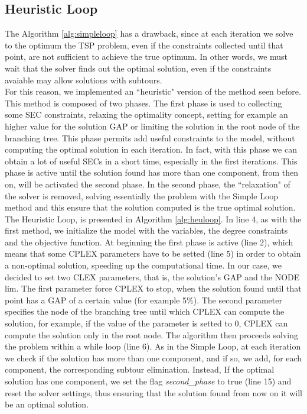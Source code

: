 \subsection{Heuristic Loop}
The Algorithm \ref{alg:simpleloop} has a drawback, since at each iteration we solve to the optimum the TSP problem, even if the constraints collected until that point, are not sufficient to achieve the true optimum. In other words, we must wait that the solver finds out the optimal solution, even if the constraints avaiable may allow solutions with subtours.
\\ For this reason, we implemented an ``heuristic" version of the method seen before. This method is composed of two phases. The first phase is used to collecting some SEC constraints, relaxing the optimality concept, setting for example an higher value for the solution GAP or limiting the solution in the root node of the branching tree.
This phase permits add useful constraints to the model, without computing the optimal solution in each iteration. In fact, with this phase we can obtain a lot of useful SECs in a short time, especially in the first iterations.
This phase is active until the solution found has more than one component, from then on, will be activated the second phase. 
In the second phase, the ``relaxation" of the solver is removed, solving essentially the problem with the Simple Loop method and this ensure that the solution computed is the true optimal solution.
\\ The Heuristic Loop, is presented in Algorithm \ref{alg:heuloop}. In line 4, as with the first method, we initialize the model with the variables, the degree constraints and the objective function.
At beginning the first phase is active (line 2), which means that some CPLEX parameters have to be setted (line 5) in order to obtain a non-optimal solution, speeding up the computational time. In our case, we decided to set two CLEX parameters, that is, the solution's GAP and the NODE lim. The first parameter force CPLEX to stop, when the solution found until that point has a GAP of a certain value (for example 5\%). The second parameter specifies the node of the branching tree until which CPLEX can compute the solution, for example, if the value of the parameter is setted to 0, CPLEX can compute the solution only in the root node.
The algorithm then proceeds solving the problem within a while loop (line 6). As in the Simple Loop, at each iteration we check if the solution has more than one component, and if so, we add, for each component, the corresponding subtour elimination. Instead, If the optimal solution has one component, we set the flag \textit{second\_phase} to true (line 15) and reset the solver settings, thus ensuring that the solution found from now on it will be an optimal solution.
